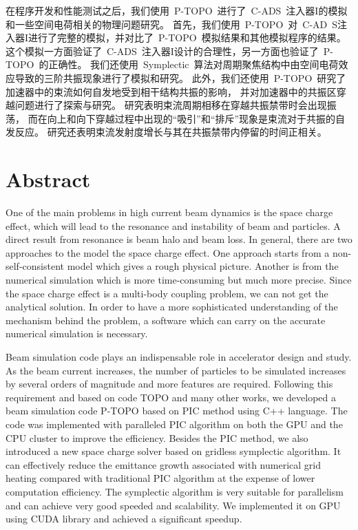 在程序开发和性能测试之后，我们使用~P-TOPO~进行了~C-ADS~注入器I的模拟和一些空间电荷相关的物理问题研究。
首先，我们使用~P-TOPO~对~C-AD~S注入器I进行了完整的模拟，并对比了~P-TOPO~模拟结果和其他模拟程序的结果。
这个模拟一方面验证了~C-ADS~注入器I设计的合理性，另一方面也验证了~P-TOPO~的正确性。
我们还使用~Symplectic~算法对周期聚焦结构中由空间电荷效应导致的三阶共振现象进行了模拟和研究。
此外，我们还使用~P-TOPO~研究了加速器中的束流如何自发地受到相干结构共振的影响，
并对加速器中的共振区穿越问题进行了探索与研究。
研究表明束流周期相移在穿越共振禁带时会出现振荡，
而在向上和向下穿越过程中出现的“吸引”和“排斥”现象是束流对于共振的自发反应。
研究还表明束流发射度增长与其在共振禁带内停留的时间正相关。



\chapter{Abstract}%

One of the main problems in high current beam dynamics is the space charge effect, which will lead to the resonance and instability of beam and particles.
A direct result from resonance is beam halo and beam loss.
In general, there are two approaches to the model the space charge effect.
One approach starts from a non-self-consistent model which gives a rough physical picture.
Another is from the numerical simulation which is more time-consuming but much more precise.
Since the space charge effect is a multi-body coupling problem, we can not get the analytical solution.
In order to have a more sophisticated understanding of the mechanism behind the problem,
a software which can carry on the accurate numerical simulation is necessary.

Beam simulation code plays an indispensable role in accelerator design and study.
As the beam current increases, the number of particles to be simulated increases
by several orders of magnitude and more features are required.
Following this requirement and based on code TOPO and many other works, we developed a beam
simulation code P-TOPO based on PIC method using C++ language.
The code was implemented with paralleled PIC algorithm on
both the GPU and the CPU cluster to improve the efficiency.
Besides the PIC method, we also introduced a new space
charge solver based on gridless symplectic algorithm.
It can effectively reduce the emittance growth associated with numerical
grid heating compared with traditional PIC algorithm at the expense of lower computation efficiency.
The symplectic algorithm is very suitable for parallelism and can achieve very good speeded and scalability.
We implemented it on GPU using CUDA library and achieved a significant speedup.

